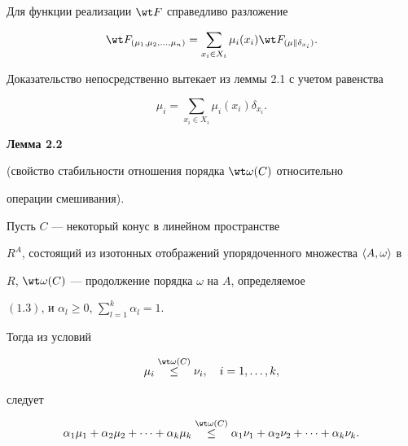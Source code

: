  


\begin{cornonum} 


Для функции реализации $\wt F$ справедливо разложение 


\begin{equation} 


\wt F_{(\mu_1,\mu_2,\dotsc,\mu_n)}=\sum_{x_i\in X_i} 


\mu_i(x_i)\wt F_{(\mu\|\delta_{x_i})}. 


\end{equation} 


\end{cornonum} 


 


Доказательство непосредственно вытекает из леммы 2.1 с учетом равенства 


$$ 


\mu_i=\sum_{x_i\in X_i}\mu_i(x_i)\delta_{x_i}. 


$$ 


 


{\bf Лемма 2.2}


(свойство стабильности отношения порядка $\wt\omega(C)$ относительно 


операции смешивания). {\it 


Пусть $C$ --- некоторый конус в линейном пространстве 


$R^A$, состоящий из изотонных отображений упорядоченного множества $\la 


A,\omega\ra$ в 


$R$, $\wt\omega(C)$ --- продолжение порядка $\omega$ на $A$, определяемое 


$(1.3)$, и $\alpha_l\ge0$, $\sum\limits^k_{l=1}\alpha_l=1$. 


Тогда из условий 


\begin{equation} 


\mu_i\up{\wt\omega(C)}{\le}\nu_i,\quad i=1,\dotsc,k, 


\end{equation} 


следует 


\begin{equation} 


\alpha_1\mu_1+\alpha_2\mu_2+\dotsb+\alpha_k\mu_k 


\up{\wt\omega(C)}{\le}\alpha_1\nu_1+\alpha_2\nu_2+\dotsb+ 


\alpha_k\nu_k. 


\end{equation} 


}


